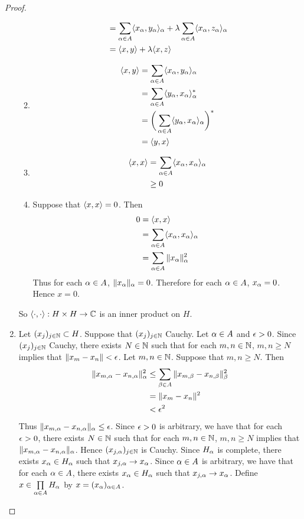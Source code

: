 \documentclass{book}
\begin{document}
\begin{proof}
\begin{enumerate}
\begin{enumerate}
\begin{align*}
				& =  \sum\limits_{\alpha \in A} \langle x_{\alpha}, y_{\alpha} \rangle_{\alpha} + \lambda \sum\limits_{\alpha \in A} \langle x_{\alpha}, z_{\alpha} \rangle_{\alpha}  \\
				& = \langle x, y \rangle + \lambda \langle x, z \rangle 
			\end{align*}
			\item 
			\begin{align*}
				\langle x,y \rangle
				& = \sum\limits_{\alpha \in A} \langle x_{\alpha}, y_{\alpha} \rangle_{\alpha} \\
				& = \sum\limits_{\alpha \in A} \langle y_{\alpha}, x_{\alpha} \rangle_{\alpha}^* \\
				& = \bigg( \sum\limits_{\alpha \in A} \langle y_{\alpha}, x_{\alpha} \rangle_{\alpha} \bigg)^* \\
				& = \langle y, x \rangle 
			\end{align*}
			\item 
			\begin{align*}
				\langle x, x \rangle 
				& = \sum\limits_{\alpha \in A} \langle x_{\alpha}, x_{\alpha} \rangle_{\alpha} \\
				& \geq 0
			\end{align*}
			\item Suppose that $\langle x, x \rangle = 0$. Then 
			\begin{align*}
				0
				& = \langle x, x \rangle \\
				& = \sum\limits_{\alpha \in A} \langle x_{\alpha}, x_{\alpha} \rangle_{\alpha} \\
				& = \sum\limits_{\alpha \in A} \|x_{\alpha}\|_{\alpha}^2  
			\end{align*}
			Thus for each $\alpha \in A$, $\|x_{\alpha} \|_{\alpha} = 0$. Therefore for each $\alpha \in A$, $x_{\alpha} = 0$. Hence $x = 0$.
		\end{enumerate}
		So $\langle \cdot, \cdot \rangle: H \times H \rightarrow \mathbb{C}$ is an inner product on $H$.
		\item Let $(x_j)_{j \in \mathbb{N}} \subset H$. Suppose that $(x_j)_{j \in \mathbb{N}}$ Cauchy. Let $\alpha \in A$ and $\epsilon > 0$. Since $(x_j)_{j \in \mathbb{N}}$ Cauchy, there exists $N \in \mathbb{N}$ such that for each $m,n \in \mathbb{N}$, $m,n \geq N$ implies that $\|x_m - x_n\| < \epsilon$. Let $m,n \in \mathbb{N}$. Suppose that $m,n \geq N$. Then 
		\begin{align*}
			\|x_{m,\alpha} - x_{n, \alpha}\|_{\alpha}^2 
			& \leq \sum_{\beta \in A} \|x_{m,\beta} - x_{n,\beta}\|_{\beta}^2 \\
			& = \|x_{m} - x_{n}\|^2 \\
			& < \epsilon^2
		\end{align*}
		Thus $\|x_{m,\alpha} - x_{n, \alpha}\|_{\alpha} \leq \epsilon$. Since $\epsilon > 0$ is arbitrary, we have that for each $\epsilon >0$, there exists $N \in \mathbb{N}$ such that for each $m,n \in \mathbb{N}$, $m,n \geq N$ implies that $\|x_{m,\alpha} - x_{n, \alpha}\|_{\alpha}$. Hence $(x_{j,\alpha})_{j \in \mathbb{N}}$ is Cauchy. Since $H_{\alpha}$ is complete, there exists $x_{\alpha} \in H_{\alpha}$ such that $x_{j,\alpha} \rightarrow x_{\alpha}$. Since $\alpha \in A$ is arbitrary, we have that for each $\alpha \in A$, there exists $x_{\alpha} \in H_{\alpha}$ such that $x_{j, \alpha} \rightarrow x_{\alpha}$. Define $x \in \prod\limits_{\alpha \in A} H_{\alpha}$ by $x = (x_{\alpha})_{\alpha \in A}$. 


\end{enumerate}
\end{proof}
\end{document}
